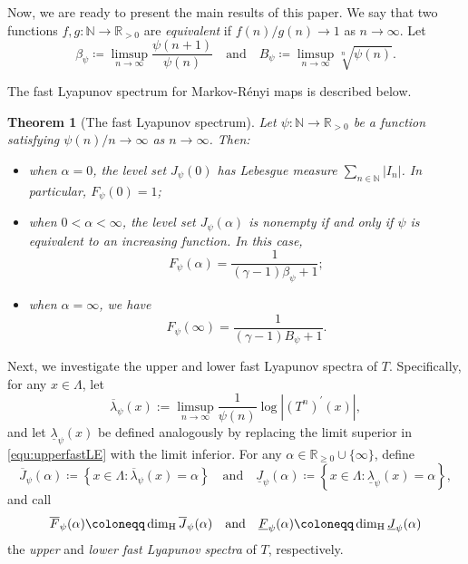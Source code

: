 \documentclass[12pt,reqno]{amsart}
\newtheorem{thmy}{Theorem}
\newenvironment{thmx}{\stepcounter{thm}\begin{thmy}}{\end{thmy}}
\renewcommand{\=}{\coloneqq}
\theoremstyle{plain}
\begin{document}
Now, we are ready to present the main results of this paper. We say that two functions $f,g: \mathbb{N}\to\mathbb{R}_{>0}$ are \emph{equivalent} if $f(n)/g(n)\to 1$ as $n\to \infty$. Let
\begin{equation*}\label{equ_constants}
    \beta_\psi \coloneqq \limsup_{n\to \infty }
    \frac{\psi(n+1)}{\psi(n)} \quad \text{and}\quad
    B_\psi\coloneqq
    \limsup_{n\to \infty}\sqrt[n]{\psi(n)}.
\end{equation*}

The fast Lyapunov spectrum for Markov-R\'{e}nyi maps is described below.


\begin{thmx}[The fast Lyapunov spectrum]\label{t.Fast_Lyapunov}
Let $\psi:\mathbb{N}\to\mathbb{R}_{>0}$ be a function satisfying $\psi(n)/n \to \infty$ as $n\to \infty$. Then:
\begin{itemize}
  \item[(i)] when $\alpha =0$, the level set $J_\psi(0)$ has Lebesgue measure $\sum_{n \in \mathbb N}|I_n|$. In particular, $F_{\psi}(0)=1$;
  \item[(ii)] when $0<\alpha <\infty$, the level set $J_{\psi}(\alpha)$ is nonempty if and only if $\psi$ is equivalent to an increasing function. In this case,
\begin{equation*}\label{e.value_fast}
                F_{\psi}(\alpha)=
                \frac{1}{(\gamma-1)\beta_\psi+1};
\end{equation*}
\item[(iii)] when $\alpha =\infty$, we have
\begin{equation*}\label{equ:boudarypoints}
                F_{\psi}(\infty)=\frac{1}{(\gamma-1)B_\psi+1}.
\end{equation*}
\end{itemize}
\end{thmx}

Next, we investigate the upper and lower fast Lyapunov spectra of $T$. Specifically, for any $x\in \Lambda$, let
\begin{equation}\label{equ:upperfastLE}
\overline{\lambda}_{\psi}(x):=\limsup_{n \to \infty}\frac{1}{\psi(n)}\log |(T^n)^\prime(x)|,
\end{equation}
and let $\underline{\lambda}_{\psi}(x)$ be defined analogously by replacing the limit superior in \eqref{equ:upperfastLE} with the limit inferior.
For any $\alpha\in\mathbb{R}_{\geq 0} \cup\{\infty\}$, define
$$
\overline{J}_{\psi}(\alpha)\coloneqq\left\{x\in \Lambda: \overline{\lambda}_{\psi}(x) =\alpha\right\}\quad \text{and}\quad \underline{J}_{\psi}(\alpha)\coloneqq\left\{x\in \Lambda: \underline{\lambda}_{\psi}(x) =\alpha\right\},
$$
and call
\begin{equation*}\label{equ:u&lFLE}
\overline{F}_{\psi}(\alpha)\coloneqq\dim_{\rm H}\overline{J}_{\psi}(\alpha) \quad \text{and}\quad \underline{F}_{\psi}(\alpha)\coloneqq\dim_{\rm H}\underline{J}_{\psi}(\alpha)
\end{equation*}
the \emph{upper} and \emph{lower fast Lyapunov spectra} of $T$, respectively.
\end{document}
